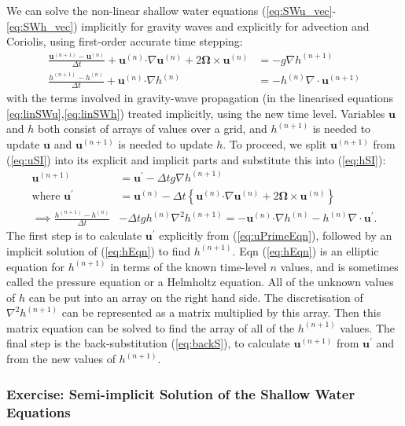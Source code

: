 We can solve the non-linear shallow water equations (\ref{eq:SWu_vec}-\ref{eq:SWh_vec})
implicitly for gravity waves and explicitly for advection and Coriolis,
using first-order accurate time stepping:
\begin{align}
\frac{\mathbf{u}^{(n+1)}-\mathbf{u}^{(n)}}{\Delta t}+\mathbf{u}^{(n)}\mathbf{\cdot}\nabla\mathbf{u}^{(n)}+2\bm{\Omega}\times\mathbf{u}^{(n)} & =-g\nabla h^{(n+1)}\label{eq:uSI}\\
\frac{h^{(n+1)}-h^{(n)}}{\Delta t}+\mathbf{u}^{(n)}\mathbf{\cdot}\nabla h^{(n)} & =-h^{(n)}\nabla\cdot\mathbf{u}^{(n+1)}\label{eq:hSI}
\end{align}
with the terms involved in gravity-wave propagation (in the linearised
equations \ref{eq:linSWu},\ref{eq:linSWh}) treated implicitly, using
the new time level. Variables $\mathbf{u}$ and $h$ both consist
of arrays of values over a grid, and $h^{(n+1)}$ is needed to update
$\mathbf{u}$ and $\mathbf{u}^{(n+1)}$ is needed to update $h$.
To proceed, we split $\mathbf{u}^{(n+1)}$ from (\ref{eq:uSI}) into
its explicit and implicit parts and substitute this into (\ref{eq:hSI}):
\begin{align}
\mathbf{u}^{(n+1)} & =\mathbf{u}^{\prime}-\Delta tg\nabla h^{(n+1)}\label{eq:backS}\\
\text{where }\mathbf{u}^{\prime} & =\mathbf{u}^{(n)}-\Delta t\left\{ \mathbf{u}^{(n)}\mathbf{\cdot}\nabla\mathbf{u}^{(n)}+2\bm{\Omega}\times\mathbf{u}^{(n)}\right\} \label{eq:uPrimeEqn}\\
\implies\frac{h^{(n+1)}-h^{(n)}}{\Delta t} & -\Delta tgh^{(n)}\nabla^{2}h^{(n+1)}=-\mathbf{u}^{(n)}\mathbf{\cdot}\nabla h^{(n)}-h^{(n)}\nabla\cdot\mathbf{u}^{\prime}.\label{eq:hEqn}
\end{align}
The first step is to calculate $\mathbf{u}^{\prime}$ explicitly from
(\ref{eq:uPrimeEqn}), followed by an implicit solution of (\ref{eq:hEqn})
to find $h^{(n+1)}$. Eqn (\ref{eq:hEqn}) is an elliptic equation
for $h^{(n+1)}$ in terms of the known time-level $n$ values, and
is sometimes called the pressure equation or a Helmholtz equation.
All of the unknown values of $h$ can be put into an array on the
right hand side. The discretisation of $\nabla^{2}h^{(n+1)}$ can
be represented as a matrix multiplied by this array. Then this matrix
equation can be solved to find the array of all of the $h^{(n+1)}$
values. The final step is the back-substitution (\ref{eq:backS}),
to calculate $\mathbf{u}^{(n+1)}$ from $\mathbf{u}^{\prime}$ and
from the new values of $h^{(n+1)}$.

\subsubsection{Exercise: Semi-implicit Solution of the Shallow Water Equations}\label{ex:SI_SWE}

